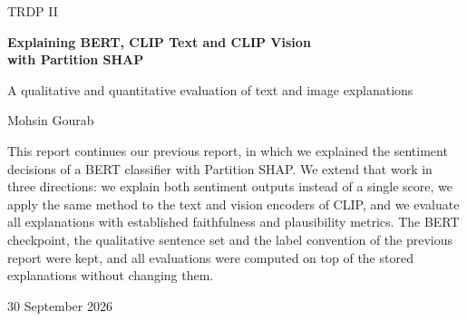 \documentclass[11pt,a4paper]{article}
\begin{document}
\hypersetup{pageanchor=false}
\begin{titlepage}
  \centering
  \vspace*{22mm}
  {\Large TRDP II\par}
  \vspace{16mm}
  {\huge\bfseries Explaining BERT, CLIP Text and CLIP Vision\\[2mm] with Partition SHAP\par}
  \vspace{6mm}
  {\Large A qualitative and quantitative evaluation of text and image explanations\par}
  \vspace{24mm}
  {\large Mohsin Gourab\par}
  \vfill
  \begin{minipage}{0.84\textwidth}
    \small
    This report continues our previous report, in which we explained the sentiment
    decisions of a BERT classifier with Partition SHAP. We extend that work in three
    directions: we explain both sentiment outputs instead of a single score, we apply the
    same method to the text and vision encoders of CLIP, and we evaluate all explanations
    with established faithfulness and plausibility metrics. The BERT checkpoint, the
    qualitative sentence set and the label convention of the previous report were kept, and
    all evaluations were computed on top of the stored explanations without changing them.
  \end{minipage}
  \vfill
  {\large 30 September 2026\par}
\end{titlepage}
\hypersetup{pageanchor=true}
\end{document}
